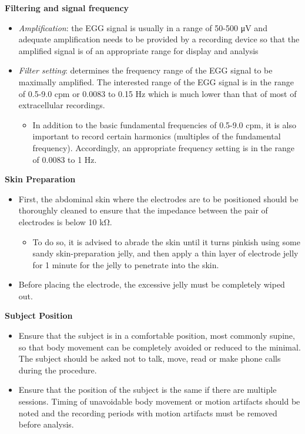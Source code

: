 \documentclass[]{book}
\providecommand{\tightlist}{%
  \setlength{\itemsep}{0pt}\setlength{\parskip}{0pt}}
\begin{document}
\textbf{Filtering and signal frequency}

\begin{itemize}
\tightlist
\item
  \emph{Amplification}: the EGG signal is usually in a range of 50-500 μV and adequate amplification needs to be provided by a recording device so that the amplified signal is of an appropriate range for display and analysis
\item
  \emph{Filter setting}: determines the frequency range of the EGG signal to be maximally amplified. The interested range of the EGG signal is in the range of 0.5-9.0 cpm or 0.0083 to 0.15 Hz which is much lower than that of most of extracellular recordings.

  \begin{itemize}
  \tightlist
  \item
    In addition to the basic fundamental frequencies of 0.5-9.0 cpm, it is also important to record certain harmonics (multiples of the fundamental frequency). Accordingly, an appropriate frequency setting is in the range of 0.0083 to 1 Hz.
  \end{itemize}
\end{itemize}

\textbf{Skin Preparation}

\begin{itemize}
\tightlist
\item
  First, the abdominal skin where the electrodes are to be positioned should be thoroughly cleaned to ensure that the impedance between the pair of electrodes is below 10 kΩ.

  \begin{itemize}
  \tightlist
  \item
    To do so, it is advised to abrade the skin until it turns pinkish using some sandy skin-preparation jelly, and then apply a thin layer of electrode jelly for 1 minute for the jelly to penetrate into the skin.
  \end{itemize}
\item
  Before placing the electrode, the excessive jelly must be completely wiped out.
\end{itemize}

\textbf{Subject Position}

\begin{itemize}
\tightlist
\item
  Ensure that the subject is in a comfortable position, most commonly supine, so that body movement can be completely avoided or reduced to the minimal. The subject should be asked not to talk, move, read or make phone calls during the procedure.
\item
  Ensure that the position of the subject is the same if there are multiple sessions. Timing of unavoidable body movement or motion artifacts should be noted and the recording periods with motion artifacts must be removed before analysis.
\end{itemize}
\end{document}
